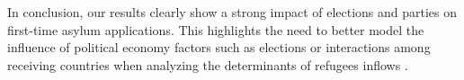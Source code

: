 \documentclass[a4paper,12pt]{article}
\begin{document}
In conclusion, our results clearly show a strong impact of elections and parties on first-time asylum applications. This highlights the need to better model the influence of political economy factors such as elections or interactions among receiving countries when analyzing the determinants of refugees inflows \citep{gorlach2017}. 



\pagebreak


%
\end{document}
